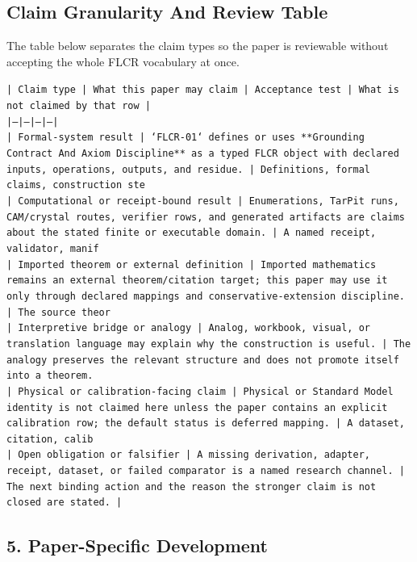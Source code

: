 \documentclass[11pt]{article}
\begin{document}
\subsection*{Claim Granularity And Review Table}

The table below separates the claim types so the paper is reviewable without accepting the whole FLCR vocabulary at once.

\noindent\texttt{| Claim type | What this paper may claim | Acceptance test | What is not claimed by that row |}\\
\noindent\texttt{|---|---|---|---|}\\
\noindent\texttt{| Formal-system result | `FLCR-01` defines or uses **Grounding Contract And Axiom Discipline** as a typed FLCR object with declared inputs, operations, outputs, and residue. | Definitions, formal claims, construction ste}\\
\noindent\texttt{| Computational or receipt-bound result | Enumerations, TarPit runs, CAM/crystal routes, verifier rows, and generated artifacts are claims about the stated finite or executable domain. | A named receipt, validator, manif}\\
\noindent\texttt{| Imported theorem or external definition | Imported mathematics remains an external theorem/citation target; this paper may use it only through declared mappings and conservative-extension discipline. | The source theor}\\
\noindent\texttt{| Interpretive bridge or analogy | Analog, workbook, visual, or translation language may explain why the construction is useful. | The analogy preserves the relevant structure and does not promote itself into a theorem. }\\
\noindent\texttt{| Physical or calibration-facing claim | Physical or Standard Model identity is not claimed here unless the paper contains an explicit calibration row; the default status is deferred mapping. | A dataset, citation, calib}\\
\noindent\texttt{| Open obligation or falsifier | A missing derivation, adapter, receipt, dataset, or failed comparator is a named research channel. | The next binding action and the reason the stronger claim is not closed are stated. | }\\

\subsection*{5. Paper-Specific Development}
\end{document}
